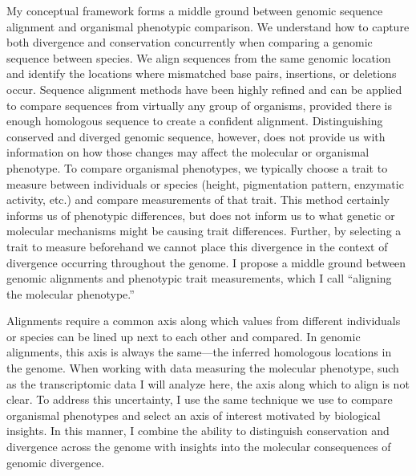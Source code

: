 My conceptual framework forms a middle ground between genomic sequence alignment and organismal phenotypic comparison. We understand how to capture both divergence and conservation concurrently when comparing a genomic sequence between species. We align sequences from the same genomic location and identify the locations where mismatched base pairs, insertions, or deletions occur. Sequence alignment methods have been highly refined and can be applied to compare sequences from virtually any group of organisms, provided there is enough homologous sequence to create a confident alignment. Distinguishing conserved and diverged genomic sequence, however, does not provide us with information on how those changes may affect the molecular or organismal phenotype. To compare organismal phenotypes, we typically choose a trait to measure between individuals or species (height, pigmentation pattern, enzymatic activity, etc.) and compare measurements of that trait. This method certainly informs us of phenotypic differences, but does not inform us to what genetic or molecular mechanisms might be causing trait differences. Further, by selecting a trait to measure beforehand we cannot place this divergence in the context of divergence occurring throughout the genome. I propose a middle ground between genomic alignments and phenotypic trait measurements, which I call ``aligning the molecular phenotype.'' 

Alignments require a common axis along which values from different individuals or species can be lined up next to each other and compared. In genomic alignments, this axis is always the same---the inferred homologous locations in the genome. When working with data measuring the molecular phenotype, such as the transcriptomic data I will analyze here, the axis along which to align is not clear. To address this uncertainty, I use the same technique we use to compare organismal phenotypes and select an axis of interest motivated by biological insights. In this manner, I combine the ability to distinguish conservation and divergence across the genome with insights into the molecular consequences of genomic divergence.

